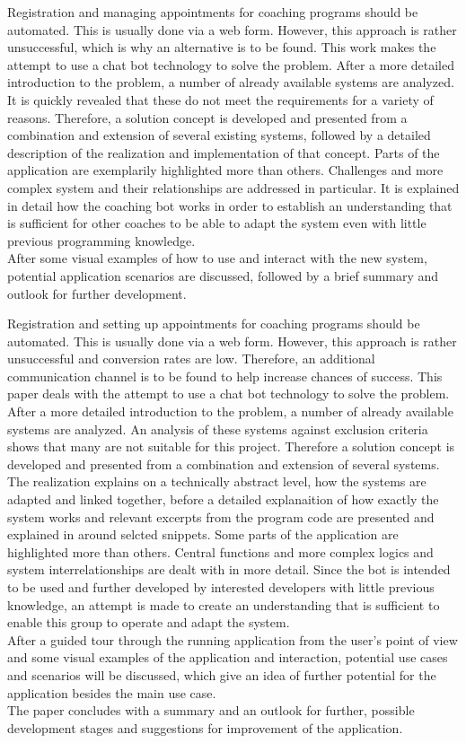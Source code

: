 Registration and managing appointments for coaching programs should be automated. This is usually done via a web form. However, this approach is rather unsuccessful, which is why an alternative is to be found. This work makes the attempt to use a chat bot technology to solve the problem. After a more detailed introduction to the problem, a number of already available systems are analyzed. It is quickly revealed that these do not meet the requirements for a variety of reasons. Therefore, a solution concept is developed and presented from a combination and extension of several existing systems, followed by a detailed description of the realization and implementation of that concept. Parts of the application are exemplarily highlighted more than others. Challenges and more complex system and their relationships are addressed in particular. It is explained in detail how the coaching bot works in order to establish an understanding that is sufficient for other coaches to be able to adapt the system even with little previous programming knowledge. \\
After some visual examples of how to use and interact with the new system, potential application scenarios are discussed, followed by a brief summary and outlook for further development. 

Registration and setting up appointments for coaching programs should be automated. This is usually done via a web form. However, this approach is rather unsuccessful and conversion rates are low. Therefore, an additional communication channel is to be found to help increase chances of success. This paper deals with the attempt to use a chat bot technology to solve the problem. After a more detailed introduction to the problem, a number of already available systems are analyzed. An analysis of these systems against exclusion criteria shows that many are not suitable for this project. Therefore a solution concept is developed and presented from a combination and extension of several systems. The realization explains on a  technically abstract level, how the systems are adapted and linked together, before a detailed explanaition of how exactly the system works and relevant excerpts from the program code are presented and explained in around selcted snippets. Some parts of the application are highlighted more than others. Central functions and more complex logics and system interrelationships are dealt with in more detail. Since the bot is intended to be used and further developed by interested developers with little previous knowledge, an attempt is made to create an understanding that is sufficient to enable this group to operate and adapt the system. \\
After a guided tour through the running application from the user's point of view and some visual examples of the application and interaction, potential use cases and scenarios will be discussed, which give an idea of further potential for the application besides the main use case. \\
The paper concludes with a summary and an outlook for further, possible development stages and suggestions for improvement of the application.